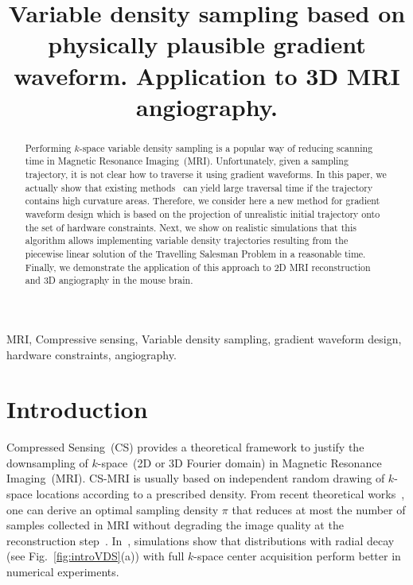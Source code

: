 \documentclass{article}
\title{Variable density sampling based on physically plausible gradient waveform. Application to 3D MRI angiography.}
\begin{document}
\ninept
\maketitle
\begin{abstract}
Performing $k$-space variable density sampling is a popular way of reducing scanning time in Magnetic Resonance Imaging~(MRI). Unfortunately, given a sampling trajectory, it is not clear how to traverse it using gradient waveforms. In this paper, we actually show that existing methods~\cite{Lustig08,Vaziri13} can yield large traversal time if the trajectory contains high curvature areas. Therefore, we consider here a new method for gradient waveform design which is based on the projection of unrealistic initial trajectory onto the set of hardware constraints. Next, we show on realistic simulations that this algorithm allows implementing variable density trajectories resulting from the piecewise linear solution of the Travelling Salesman Problem in a reasonable time. Finally, we demonstrate the application of this approach to 2D MRI reconstruction and 3D angiography in the mouse brain.
\end{abstract}
\begin{keywords}
MRI, Compressive sensing, Variable density sampling, gradient waveform design, hardware constraints, angiography.
\end{keywords}
\section{Introduction}
\label{sec:intro}
Compressed Sensing~(CS) provides a theoretical framework to justify the downsampling of $k$-space~(2D or 3D Fourier domain) in Magnetic Resonance Imaging~(MRI). CS-MRI is usually based on independent random drawing of $k$-space locations according to a prescribed density. From recent theoretical works~\cite{Candes11,Rauhut10}, one can derive an optimal sampling density $\pi$ that reduces at most the number of samples collected in MRI without degrading the image quality at the reconstruction step~\cite{Chauffert13,Puy11}. In~\cite{Chauffert14}, simulations show that distributions with radial decay (see Fig.~\ref{fig:introVDS}(a)) with full $k$-space center acquisition perform better in numerical experiments. 
\end{document}
